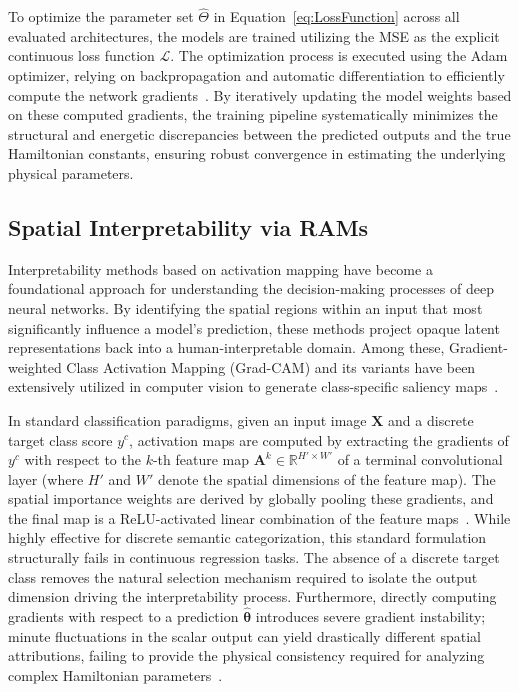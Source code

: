 \documentclass[final,5p,times,twocolumn]{elsarticle}
\begin{document}
\begin{itemize}
To optimize the parameter set $\hat{\Theta}$ in Equation~\ref{eq:LossFunction} across all evaluated architectures, the models are trained utilizing the MSE as the explicit continuous loss function $\mathcal{L}$. The optimization process is executed using the Adam optimizer, relying on backpropagation and automatic differentiation to efficiently compute the network gradients~\cite{murakami2022inverse}. By iteratively updating the model weights based on these computed gradients, the training pipeline systematically minimizes the structural and energetic discrepancies between the predicted outputs and the true Hamiltonian constants, ensuring robust convergence in estimating the underlying physical parameters.

\end{itemize}

\subsection{Spatial Interpretability via RAMs}\label{sec:RAMs}

Interpretability methods based on activation mapping have become a foundational approach for understanding the decision-making processes of deep neural networks. By identifying the spatial regions within an input that most significantly influence a model's prediction, these methods project opaque latent representations back into a human-interpretable domain. Among these, Gradient-weighted Class Activation Mapping (Grad-CAM) and its variants have been extensively utilized in computer vision to generate class-specific saliency maps~\cite{vinogradova2020gradcam}. 

In standard classification paradigms, given an input image $\mathbf{X}$ and a discrete target class score $y^c$, activation maps are computed by extracting the gradients of $y^c$ with respect to the $k$-th feature map $\mathbf{A}^k \in \mathbb{R}^{H' \times W'}$ of a terminal convolutional layer (where $H'$ and $W'$ denote the spatial dimensions of the feature map). The spatial importance weights are derived by globally pooling these gradients, and the final map is a ReLU-activated linear combination of the feature maps~\cite{zhang2024gradcam}. While highly effective for discrete semantic categorization, this standard formulation structurally fails in continuous regression tasks. The absence of a discrete target class removes the natural selection mechanism required to isolate the output dimension driving the interpretability process. Furthermore, directly computing gradients with respect to a prediction $\hat{\boldsymbol{\theta}}$ introduces severe gradient instability; minute fluctuations in the scalar output can yield drastically different spatial attributions, failing to provide the physical consistency required for analyzing complex Hamiltonian parameters~\cite{makke2024symbolic}.
\end{document}
